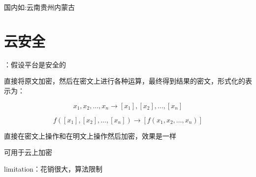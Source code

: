 国内如:云南贵州内蒙古



\chapter{云安全}

：假设平台是安全的

\begin{definition}
    直接将原文加密，然后在密文上进行各种运算，最终得到结果的密文，形式化的表示为：

    $$ x_{1}, x_{2}, \ldots, x_{n} \rightarrow\left[x_{1}\right],\left[x_{2}\right], \ldots,\left[x_{n}\right] $$

    $$ f\left(\left[x_{1}\right],\left[x_{2}\right], \ldots,\left[x_{n}\right]\right) \rightarrow\left[f\left(x_{1}, x_{2}, \ldots, x_{n}\right)\right] $$
    
    直接在密文上操作和在明文上操作然后加密，效果是一样

    可用于云上加密

limitation：花销很大，算法限制
\end{definition}
